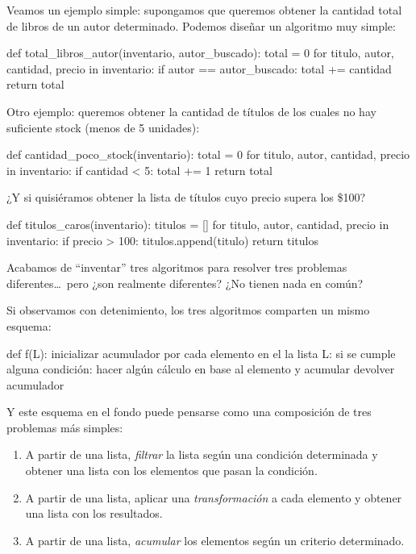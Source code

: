 \begin{subappendices}
Veamos un ejemplo simple: supongamos que queremos obtener la cantidad total de
libros de un autor determinado. Podemos diseñar un algoritmo muy simple:

\begin{codigo-python-sn}
def total_libros_autor(inventario, autor_buscado):
    total = 0
    for titulo, autor, cantidad, precio in inventario:
        if autor == autor_buscado:
            total += cantidad
    return total
\end{codigo-python-sn}

Otro ejemplo: queremos obtener la cantidad de títulos de los cuales no hay
suficiente stock (menos de 5 unidades):

\begin{codigo-python-sn}
def cantidad_poco_stock(inventario):
    total = 0
    for titulo, autor, cantidad, precio in inventario:
        if cantidad < 5:
            total += 1
    return total
\end{codigo-python-sn}

¿Y si quisiéramos obtener la lista de títulos cuyo precio supera los \$100?

\begin{codigo-python-sn}
def titulos_caros(inventario):
    titulos = []
    for titulo, autor, cantidad, precio in inventario:
        if precio > 100:
            titulos.append(titulo)
    return titulos
\end{codigo-python-sn}

Acabamos de ``inventar'' tres algoritmos para resolver tres problemas
diferentes\ldots\ pero ¿son realmente diferentes? ¿No tienen nada en común?

Si observamos con detenimiento, los tres algoritmos comparten un mismo esquema:

\begin{codigo-nohl-sn}
def f(L):
    inicializar acumulador
    por cada elemento en el la lista L:
        si se cumple alguna condición:
            hacer algún cálculo en base al elemento y acumular
    devolver acumulador
\end{codigo-nohl-sn}

Y este esquema en el fondo puede pensarse como una composición de tres
problemas más simples:

\begin{enumerate}
    \item A partir de una lista, \emph{filtrar} la lista según una condición
        determinada y obtener una lista con los elementos que pasan la
        condición.
    \item A partir de una lista, aplicar una \emph{transformación} a cada elemento
        y obtener una lista con los resultados.
    \item A partir de una lista, \emph{acumular} los elementos según un
        criterio determinado.
\end{enumerate}


\end{subappendices}

